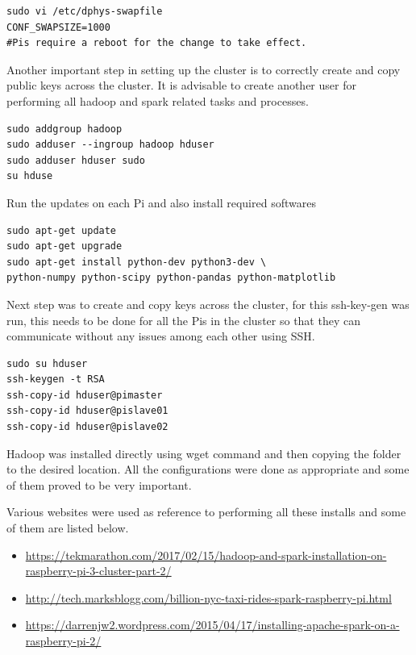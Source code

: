 \begin{verbatim}
sudo vi /etc/dphys-swapfile
CONF_SWAPSIZE=1000
#Pis require a reboot for the change to take effect.
\end{verbatim}

Another important step in setting up the cluster is to correctly create and copy public keys across the cluster. It is advisable to create another user for performing all hadoop and spark related tasks and processes.

\begin{verbatim}
sudo addgroup hadoop
sudo adduser --ingroup hadoop hduser
sudo adduser hduser sudo
su hduse
\end{verbatim}

Run the updates on each Pi and also install required softwares
\begin{verbatim}
sudo apt-get update
sudo apt-get upgrade
sudo apt-get install python-dev python3-dev \
python-numpy python-scipy python-pandas python-matplotlib
\end{verbatim}

Next step was to create and copy keys across the cluster, for this ssh-key-gen was run, this needs to be done for all the Pis in the cluster so that they can communicate without any issues among each other using SSH.

\begin{verbatim}
sudo su hduser
ssh-keygen -t RSA
ssh-copy-id hduser@pimaster
ssh-copy-id hduser@pislave01
ssh-copy-id hduser@pislave02
\end{verbatim}

Hadoop was installed directly using wget command and then copying the folder to the desired location.
All the configurations were done as appropriate and some of them proved to be very important.

Various websites were used as reference to performing all these installs and some of them are listed below.

\begin{itemize}
\item 
\url{https://tekmarathon.com/2017/02/15/hadoop-and-spark-installation-on-raspberry-pi-3-cluster-part-2/}
\item \url{http://tech.marksblogg.com/billion-nyc-taxi-rides-spark-raspberry-pi.html}
\item \url{https://darrenjw2.wordpress.com/2015/04/17/installing-apache-spark-on-a-raspberry-pi-2/}
\end{itemize}

